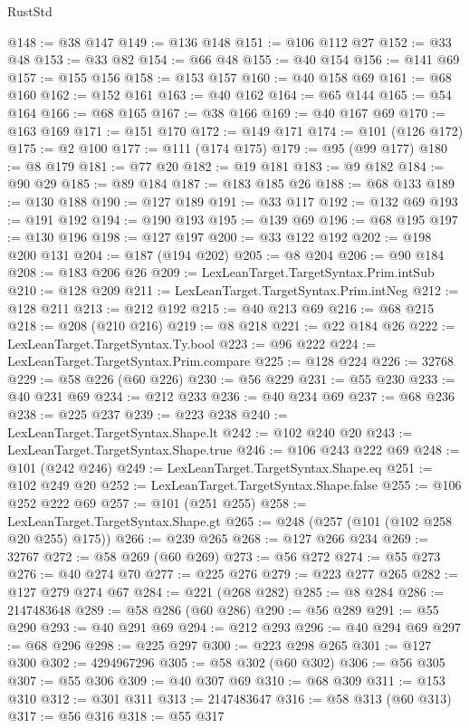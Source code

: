 \begin{lexlean}{RustStd}
\begin{coremodule}
@148 := @38 @147
@149 := @136 @148
@151 := @106 @112 @27
@152 := @33 @48
@153 := @33 @82
@154 := @66 @48
@155 := @40 @154
@156 := @141 @69
@157 := @155 @156
@158 := @153 @157
@160 := @40 @158 @69
@161 := @68 @160
@162 := @152 @161
@163 := @40 @162
@164 := @65 @144
@165 := @54 @164
@166 := @68 @165
@167 := @38 @166
@169 := @40 @167 @69
@170 := @163 @169
@171 := @151 @170
@172 := @149 @171
@174 := @101 (@126 @172)
@175 := @2 @100
@177 := @111 (@174 @175)
@179 := @95 (@99 @177)
@180 := @8 @179
@181 := @77 @20
@182 := @19 @181
@183 := @9 @182
@184 := @90 @29
@185 := @89 @184
@187 := @183 @185 @26
@188 := @68 @133
@189 := @130 @188
@190 := @127 @189
@191 := @33 @117
@192 := @132 @69
@193 := @191 @192
@194 := @190 @193
@195 := @139 @69
@196 := @68 @195
@197 := @130 @196
@198 := @127 @197
@200 := @33 @122 @192
@202 := @198 @200 @131
@204 := @187 (@194 @202)
@205 := @8 @204
@206 := @90 @184
@208 := @183 @206 @26
@209 := LexLeanTarget.TargetSyntax.Prim.intSub
@210 := @128 @209
@211 := LexLeanTarget.TargetSyntax.Prim.intNeg
@212 := @128 @211
@213 := @212 @192
@215 := @40 @213 @69
@216 := @68 @215
@218 := @208 (@210 @216)
@219 := @8 @218
@221 := @22 @184 @26
@222 := LexLeanTarget.TargetSyntax.Ty.bool
@223 := @96 @222
@224 := LexLeanTarget.TargetSyntax.Prim.compare
@225 := @128 @224
@226 := 32768
@229 := @58 @226 (@60 @226)
@230 := @56 @229
@231 := @55 @230
@233 := @40 @231 @69
@234 := @212 @233
@236 := @40 @234 @69
@237 := @68 @236
@238 := @225 @237
@239 := @223 @238
@240 := LexLeanTarget.TargetSyntax.Shape.lt
@242 := @102 @240 @20
@243 := LexLeanTarget.TargetSyntax.Shape.true
@246 := @106 @243 @222 @69
@248 := @101 (@242 @246)
@249 := LexLeanTarget.TargetSyntax.Shape.eq
@251 := @102 @249 @20
@252 := LexLeanTarget.TargetSyntax.Shape.false
@255 := @106 @252 @222 @69
@257 := @101 (@251 @255)
@258 := LexLeanTarget.TargetSyntax.Shape.gt
@265 := @248 (@257 (@101 (@102 @258 @20 @255) @175))
@266 := @239 @265
@268 := @127 @266 @234
@269 := 32767
@272 := @58 @269 (@60 @269)
@273 := @56 @272
@274 := @55 @273
@276 := @40 @274 @70
@277 := @225 @276
@279 := @223 @277 @265
@282 := @127 @279 @274 @67
@284 := @221 (@268 @282)
@285 := @8 @284
@286 := 2147483648
@289 := @58 @286 (@60 @286)
@290 := @56 @289
@291 := @55 @290
@293 := @40 @291 @69
@294 := @212 @293
@296 := @40 @294 @69
@297 := @68 @296
@298 := @225 @297
@300 := @223 @298 @265
@301 := @127 @300
@302 := 4294967296
@305 := @58 @302 (@60 @302)
@306 := @56 @305
@307 := @55 @306
@309 := @40 @307 @69
@310 := @68 @309
@311 := @153 @310
@312 := @301 @311
@313 := 2147483647
@316 := @58 @313 (@60 @313)
@317 := @56 @316
@318 := @55 @317

\end{coremodule}
\end{lexlean}
